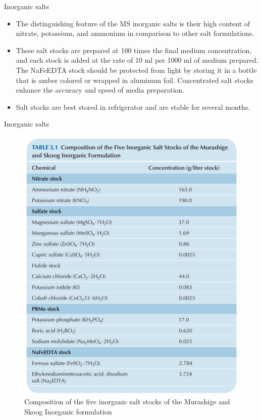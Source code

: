 \documentclass[ignorenonframetext,aspectratio=169]{beamer}
\providecommand{\tightlist}{%
  \setlength{\itemsep}{0pt}\setlength{\parskip}{0pt}}
\begin{document}
\begin{frame}{Inorganic salts}
\protect\hypertarget{inorganic-salts-1}{}

\begin{itemize}
\tightlist
\item
  The distinguishing feature of the MS inorganic salts is their high
  content of nitrate, potassium, and ammonium in comparison to other
  salt formulations.
\item
  These salt stocks are prepared at 100 times the final medium
  concentration, and each stock is added at the rate of 10 ml per 1000
  ml of medium prepared. The NaFeEDTA stock should be protected from
  light by storing it in a bottle that is amber colored or wrapped in
  aluminum foil. Concentrated salt stocks enhance the accuracy and speed
  of media preparation.
\item
  Salt stocks are best stored in refrigerator and are stable for several
  months.
\end{itemize}

\end{frame}

\begin{frame}{Inorganic salts}
\protect\hypertarget{inorganic-salts-2}{}

\begin{figure}
\includegraphics[width=0.38\linewidth]{../images/inorganic_salt_ms} \caption{Composition of the five inorganic salt stocks of the Murashige and Skoog Inorganic formulation}\label{fig:inorganic-salts}
\end{figure}

\end{frame}
\end{document}
